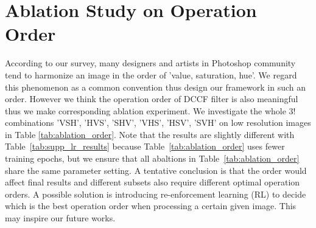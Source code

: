 \documentclass[runningheads]{llncs}
\begin{document}
   \section{Ablation Study on Operation Order}

   According to our survey, many designers and artists in Photoshop community tend to harmonize an image in the order of 'value, saturation, hue'. We regard this phenomenon as a common convention thus design our framework in such an order.
   However we think the operation order of DCCF filter is also meaningful thus we make corresponding ablation experiment.
   We investigate the whole $3!$ combinations
   'VSH', 'HVS', 'SHV', 'VHS', 'HSV', 'SVH' 
   on low resolution images in Table \ref{tab:ablation_order}. Note that the results are slightly different with Table~\ref{tab:supp_lr_results} because Table~\ref{tab:ablation_order} uses fewer training epochs, but we ensure that all abaltions in Table~\ref{tab:ablation_order} share the same parameter setting. 
   A tentative conclusion is that the order would affect final results and different subsets also require different optimal operation orders. 
   A possible solution is introducing re-enforcement learning (RL) to decide which is the best operation order when processing a certain given image. This may inspire our future works.
\end{document}
